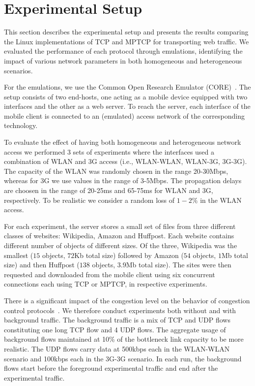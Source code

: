 \section{Experimental Setup }
\label{sec:exp_setup}
This section describes the experimental setup and presents the results comparing
the Linux implementations of TCP and MPTCP for transporting web traffic. We
evaluated the performance of each protocol through emulations, identifying the impact of various network
parameters in both homogeneous and heterogeneous scenarios. 

For the emulations, we use the Common Open Research Emulator (CORE)~\cite{CORE}. The setup consists of
two end-hosts, one acting as a mobile device equipped with two interfaces and the other as a web server. To reach the
server, each interface of the mobile client is connected to an (emulated) access network of the corresponding technology.

To evaluate the effect of having both homogeneous and heterogeneous network access we performed 3 sets
of experiments where the interfaces used a combination of WLAN and 3G access (i.e., WLAN-WLAN, WLAN-3G, 3G-3G).
The capacity of the WLAN was randomly chosen in the range 20-30Mbps, whereas for 3G we use values in the range of 3-5Mbps.
The propagation delays are choosen in the range of 20-25ms and 65-75ms for WLAN and 3G, respectively. To be realistic
we consider a random loss of $1-2\%$ in the WLAN access.

For each experiment, the server stores a small set of files from three different classes
of websites: Wikipedia, Amazon and Huffpost. Each website contains different number of objects of different sizes.
Of the three, Wikipedia was the smallest ($15$ objects, $72$Kb total size) followed by Amazon ($54$ objects, $1$Mb total size)
and then Huffpost ($138$ objects, $3.9$Mb total size). The sites were then requested and downloaded from the mobile
client using six concurrent connections each using TCP or MPTCP, in respective experiments.


There is a significant impact of the congestion level on the behavior of congestion control protocols~\cite{ha-background-traffic-comnet-2007}.
We therefore conduct experiments both without and with background traffic.  The background traffic is a mix of TCP and UDP flows constituting one
long TCP flow and 4 UDP flows. The aggregate usage of background flows maintained at 10\% of the bottleneck link capacity to be more realistic.
The UDP flows carry data at 500kbps each in the WLAN-WLAN scenario and 100kbps each in the 3G-3G scenario.  In each run, the background flows
start before the foreground experimental traffic and end after the experimental traffic.



